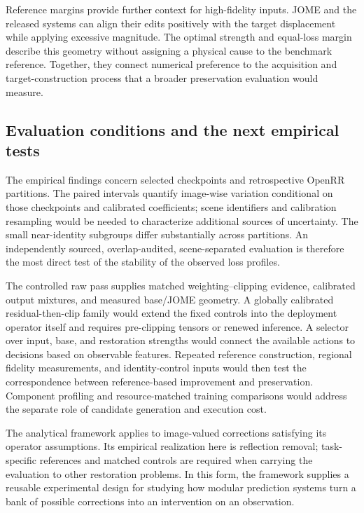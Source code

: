 \documentclass[12pt]{article}
\begin{document}
Reference margins provide further context for high-fidelity inputs. JOME and the released systems can align their edits positively with the target displacement while applying excessive magnitude. The optimal strength and equal-loss margin describe this geometry without assigning a physical cause to the benchmark reference. Together, they connect numerical preference to the acquisition and target-construction process that a broader preservation evaluation would measure.

\subsection{Evaluation conditions and the next empirical tests}
The empirical findings concern selected checkpoints and retrospective OpenRR partitions. The paired intervals quantify image-wise variation conditional on those checkpoints and calibrated coefficients; scene identifiers and calibration resampling would be needed to characterize additional sources of uncertainty. The small near-identity subgroups differ substantially across partitions. An independently sourced, overlap-audited, scene-separated evaluation is therefore the most direct test of the stability of the observed loss profiles.

The controlled raw pass supplies matched weighting--clipping evidence, calibrated output mixtures, and measured base/JOME geometry. A globally calibrated residual-then-clip family would extend the fixed controls into the deployment operator itself and requires pre-clipping tensors or renewed inference. A selector over input, base, and restoration strengths would connect the available actions to decisions based on observable features. Repeated reference construction, regional fidelity measurements, and identity-control inputs would then test the correspondence between reference-based improvement and preservation. Component profiling and resource-matched training comparisons would address the separate role of candidate generation and execution cost.

The analytical framework applies to image-valued corrections satisfying its operator assumptions. Its empirical realization here is reflection removal; task-specific references and matched controls are required when carrying the evaluation to other restoration problems. In this form, the framework supplies a reusable experimental design for studying how modular prediction systems turn a bank of possible corrections into an intervention on an observation.
\end{document}
